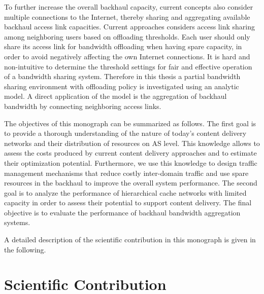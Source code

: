 To further increase the overall backhaul capacity, current concepts also consider multiple connections to the Internet, thereby sharing and aggregating available backhaul access link capacities.
Current approaches considers access link sharing among neighboring users based on offloading thresholds.
Each user should only share its access link for bandwidth offloading when having spare capacity, in order to avoid negatively affecting the own Internet connections.
It is hard and non-intuitive to determine the threshold settings for fair and effective operation of a bandwidth sharing system.
Therefore in this thesis a partial bandwidth sharing environment with offloading policy is investigated using an analytic model.
A direct application of the model is the aggregation of backhaul bandwidth by connecting neighboring access links.

The objectives of this monograph can be summarized as follows.
The first goal is to provide a thorough understanding of the nature of today's content delivery networks and their distribution of resources on AS level.
This knowledge allows to assess the costs produced by current content delivery approaches and to estimate their optimization potential.
Furthermore, we use this knowledge to design traffic management mechanisms that reduce costly inter-domain traffic and use spare resources in the backhaul to improve the overall system performance.
The second goal is to analyze the performance of hierarchical cache networks with limited capacity in order to assess their potential to support content delivery.
The final objective is to evaluate the performance of backhaul bandwidth aggregation systems.%

A detailed description of the scientific contribution in this monograph is given in the following.

\newpage
\section{Scientific Contribution}\label{sec:introduction:scientific_contribution}

